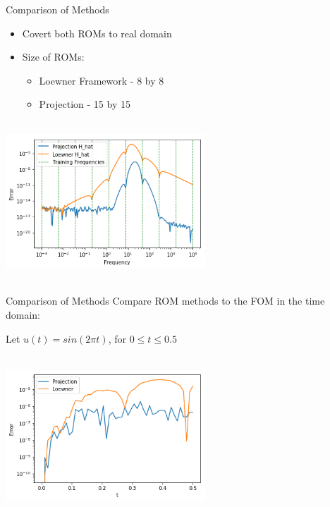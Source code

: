 \begin{frame}{Comparison of Methods}
\begin{itemize}
    \item Covert both ROMs to real domain\\
    \bigskip
    \item Size of ROMs: \\
    \begin{itemize}
        \item Loewner Framework - 8 by 8
        \item Projection - 15 by 15
    \end{itemize}
\end{itemize}

\centering
\includegraphics[width=7.5cm, height= 6cm]{figures/comparison1.png}
\end{frame}

\begin{frame}{Comparison of Methods}
Compare ROM methods to the FOM in the time domain:\\
\bigskip
\begin{center}
 Let $u(t) = sin(2 \pi t)$, for $0 \leq t \leq 0.5$   
\end{center}

\centering
\includegraphics[width=7.5cm, height= 6cm]{figures/comparison2.png}
\end{frame}
